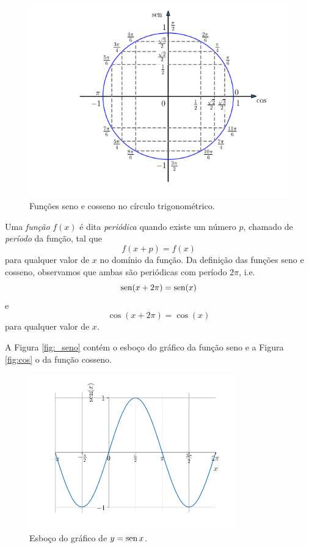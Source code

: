 \begin{figure}[H]
  \centering
  \includegraphics[width=1\textwidth]{./cap_funcao/dados/fig_cos_seno_valores/fig_cos_seno_valores}
  \caption{Funções seno e cosseno no círculo trigonométrico.}
  \label{fig:cos_seno_valores}
\end{figure}

Uma \emph{função} $f(x)$ é dita \emph{periódica} quando existe um número $p$, chamado de \emph{período} da função, tal que
\begin{equation}
  f(x+p) = f(x)
\end{equation}
para qualquer valor de $x$ no domínio da função. Da definição das funções seno e cosseno, observamos que ambas são periódicas com período $2\pi$, i.e.
\begin{equation}
  \operatorname{sen}(x+2\pi) = \operatorname{sen}(x)
\end{equation}
e
\begin{equation}
   \cos(x+2\pi) = \cos(x)
\end{equation}
para qualquer valor de $x$.

A Figura \ref{fig:_seno} contém o esboço do gráfico da função seno e a Figura \ref{fig:cos} o da função cosseno.

\begin{figure}[H]
  \centering
  \includegraphics[width=0.8\textwidth]{./cap_funcao/dados/fig_cos_seno_graficos/fig_seno_grafico}
  \caption{Esboço do gráfico de $y=\operatorname{sen} x$.}
\end{figure}

